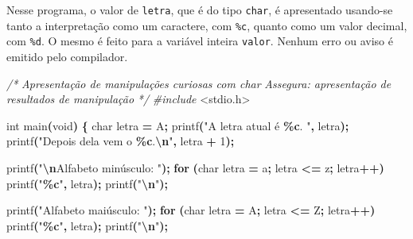 \documentclass[
  11pt,
  a4paper,
]{scrbook}
\newenvironment{Shaded}{\begin{snugshade}}{\end{snugshade}}
\newcommand{\CharTok}[1]{\textcolor[rgb]{0.31,0.60,0.02}{#1}}
\newcommand{\CommentTok}[1]{\textcolor[rgb]{0.56,0.35,0.01}{\textit{#1}}}
\newcommand{\ControlFlowTok}[1]{\textcolor[rgb]{0.13,0.29,0.53}{\textbf{#1}}}
\newcommand{\DataTypeTok}[1]{\textcolor[rgb]{0.13,0.29,0.53}{#1}}
\newcommand{\DecValTok}[1]{\textcolor[rgb]{0.00,0.00,0.81}{#1}}
\newcommand{\ImportTok}[1]{#1}
\newcommand{\NormalTok}[1]{#1}
\newcommand{\OperatorTok}[1]{\textcolor[rgb]{0.81,0.36,0.00}{\textbf{#1}}}
\newcommand{\PreprocessorTok}[1]{\textcolor[rgb]{0.56,0.35,0.01}{\textit{#1}}}
\newcommand{\SpecialCharTok}[1]{\textcolor[rgb]{0.81,0.36,0.00}{\textbf{#1}}}
\newcommand{\StringTok}[1]{\textcolor[rgb]{0.31,0.60,0.02}{#1}}
\begin{document}
Nesse programa, o valor de \texttt{letra}, que é do tipo \texttt{char},
é apresentado usando-se tanto a interpretação como um caractere, com
\texttt{\%c}, quanto como um valor decimal, com \texttt{\%d}. O mesmo é
feito para a variável inteira \texttt{valor}. Nenhum erro ou aviso é
emitido pelo compilador.

\begin{Shaded}
\begin{Highlighting}[]
\CommentTok{/*}
\CommentTok{Apresentação de manipulações curiosas com char}
\CommentTok{Assegura: apresentação de resultados de manipulação}
\CommentTok{*/}
\PreprocessorTok{\#include }\ImportTok{\textless{}stdio.h\textgreater{}}

\DataTypeTok{int}\NormalTok{ main}\OperatorTok{(}\DataTypeTok{void}\OperatorTok{)} \OperatorTok{\{}
    \DataTypeTok{char}\NormalTok{ letra }\OperatorTok{=} \CharTok{\textquotesingle{}A\textquotesingle{}}\OperatorTok{;}
\NormalTok{    printf}\OperatorTok{(}\StringTok{"A letra atual é }\SpecialCharTok{\%c}\StringTok{. "}\OperatorTok{,}\NormalTok{ letra}\OperatorTok{);}
\NormalTok{    printf}\OperatorTok{(}\StringTok{"Depois dela vem o }\SpecialCharTok{\%c}\StringTok{.}\SpecialCharTok{\textbackslash{}n}\StringTok{"}\OperatorTok{,}\NormalTok{ letra }\OperatorTok{+} \DecValTok{1}\OperatorTok{);}

\NormalTok{    printf}\OperatorTok{(}\StringTok{"}\SpecialCharTok{\textbackslash{}n}\StringTok{Alfabeto minúsculo: "}\OperatorTok{);}
    \ControlFlowTok{for} \OperatorTok{(}\DataTypeTok{char}\NormalTok{ letra }\OperatorTok{=} \CharTok{\textquotesingle{}a\textquotesingle{}}\OperatorTok{;}\NormalTok{ letra }\OperatorTok{\textless{}=} \CharTok{\textquotesingle{}z\textquotesingle{}}\OperatorTok{;}\NormalTok{ letra}\OperatorTok{++)}
\NormalTok{        printf}\OperatorTok{(}\StringTok{"}\SpecialCharTok{\%c}\StringTok{"}\OperatorTok{,}\NormalTok{ letra}\OperatorTok{);}
\NormalTok{    printf}\OperatorTok{(}\StringTok{"}\SpecialCharTok{\textbackslash{}n}\StringTok{"}\OperatorTok{);}

\NormalTok{    printf}\OperatorTok{(}\StringTok{"Alfabeto maiúsculo: "}\OperatorTok{);}
    \ControlFlowTok{for} \OperatorTok{(}\DataTypeTok{char}\NormalTok{ letra }\OperatorTok{=} \CharTok{\textquotesingle{}A\textquotesingle{}}\OperatorTok{;}\NormalTok{ letra }\OperatorTok{\textless{}=} \CharTok{\textquotesingle{}Z\textquotesingle{}}\OperatorTok{;}\NormalTok{ letra}\OperatorTok{++)}
\NormalTok{        printf}\OperatorTok{(}\StringTok{"}\SpecialCharTok{\%c}\StringTok{"}\OperatorTok{,}\NormalTok{ letra}\OperatorTok{);}
\NormalTok{    printf}\OperatorTok{(}\StringTok{"}\SpecialCharTok{\textbackslash{}n}\StringTok{"}\OperatorTok{);}


\end{Highlighting}
\end{Shaded}
\end{document}
